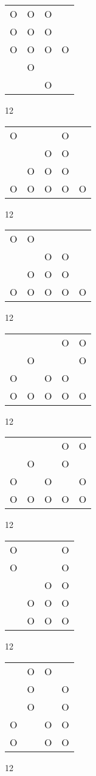 \begin{tabular}{|m{0.2cm}m{0.2cm}m{0.2cm}m{0.2cm}|}\hline
O&O&O& \\
O&O&O& \\
O&O&O&O\\
 &O& & \\
 & &O& \\
\hline\end{tabular}12
\begin{tabular}{|m{0.2cm}m{0.2cm}m{0.2cm}m{0.2cm}m{0.2cm}|}\hline
O& & &O& \\
 & &O&O& \\
 &O&O&O& \\
O&O&O&O&O\\
\hline\end{tabular}12
\begin{tabular}{|m{0.2cm}m{0.2cm}m{0.2cm}m{0.2cm}m{0.2cm}|}\hline
O&O& & & \\
 & &O&O& \\
 &O&O&O& \\
O&O&O&O&O\\
\hline\end{tabular}12
\begin{tabular}{|m{0.2cm}m{0.2cm}m{0.2cm}m{0.2cm}m{0.2cm}|}\hline
 & & &O&O\\
 &O& & &O\\
O& &O&O& \\
O&O&O&O&O\\
\hline\end{tabular}12
\begin{tabular}{|m{0.2cm}m{0.2cm}m{0.2cm}m{0.2cm}m{0.2cm}|}\hline
 & & &O&O\\
 &O& &O& \\
O& &O& &O\\
O&O&O&O&O\\
\hline\end{tabular}12
\begin{tabular}{|m{0.2cm}m{0.2cm}m{0.2cm}m{0.2cm}|}\hline
O& & &O\\
O& & &O\\
 & &O&O\\
 &O&O&O\\
 &O&O&O\\
\hline\end{tabular}12
\begin{tabular}{|m{0.2cm}m{0.2cm}m{0.2cm}m{0.2cm}|}\hline
 &O&O& \\
 &O& &O\\
 &O& &O\\
O& &O&O\\
O& &O&O\\
\hline\end{tabular}12
